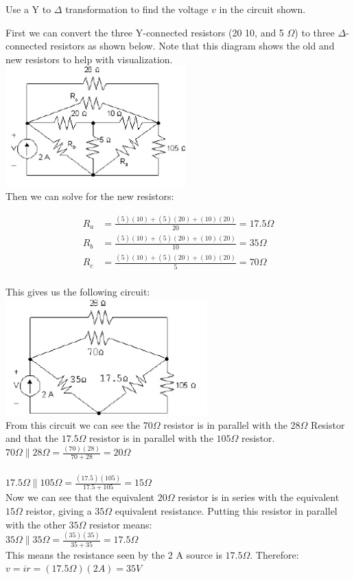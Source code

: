 Use a Y to $\Delta$ transformation to find the voltage $v$ in the circuit shown. 

First we can convert the three Y-connected resistors (20 10, and 5 $\Omega$) to three
$\Delta$-connected resistors as shown below. Note that this diagram shows the old and new resistors
to help with visualization. \\
\includegraphics{img/c3/a4}
\\ Then we can solve for the new resistors:

\begin{align*}
	R_a &= \frac{(5)(10) + (5)(20) + (10)(20)}{20} = 17.5 \Omega \\
	R_b &= \frac{(5)(10) + (5)(20) + (10)(20)}{10} = 35 \Omega \\
	R_c &= \frac{(5)(10) + (5)(20) + (10)(20)}{5} = 70 \Omega \\
\end{align*}

This gives us the following circuit: \\
\includegraphics{img/c3/a5}
\\From this circuit we can see the $70 \Omega$ resistor is in parallel with the $28 \Omega$ Resistor 
and that the $17.5 \Omega$ resistor is in parallel with the $105 \Omega$ resistor. 
\\ $ 70 \Omega \parallel 28 \Omega = \frac{(70)(28)}{70+28} = 20 \Omega $\\
\\ $ 17.5 \Omega \parallel 105 \Omega = \frac{(17.5)(105)}{17.5+105} = 15 \Omega $\\

Now we can see that the equivalent $20 \Omega$ resistor is in series with the equivalent $15 \Omega$
reistor, giving a $35 \Omega$ equivalent resistance. Putting this resistor in parallel with the
other $35 \Omega$ resistor means: 
\\ $ 35 \Omega \parallel 35 \Omega = \frac{(35)(35)}{35+35} = 17.5 \Omega  $ \\
This means the resistance seen by the 2 A source is $17.5 \Omega$. Therefore:
\\$ v = ir = (17.5 \Omega)(2 A) = 35 V $\\


